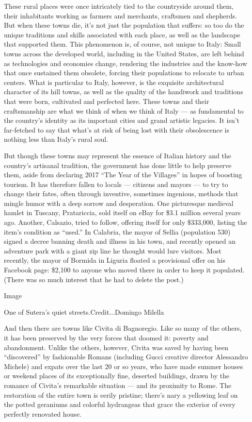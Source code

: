 These rural places were once intricately tied to the countryside around
them, their inhabitants working as farmers and merchants, craftsmen and
shepherds. But when these towns die, it's not just the population that
suffers: so too do the unique traditions and skills associated with each
place, as well as the landscape that supported them. This phenomenon is,
of course, not unique to Italy: Small towns across the developed world,
including in the United States, are left behind as technologies and
economies change, rendering the industries and the know-how that once
sustained them obsolete, forcing their populations to relocate to urban
centers. What is particular to Italy, however, is the exquisite
architectural character of its hill towns, as well as the quality of the
handiwork and traditions that were born, cultivated and perfected here.
These towns and their craftsmanship are what we think of when we think
of Italy --- as fundamental to the country's identity as its important
cities and grand artistic legacies. It isn't far-fetched to say that
what's at risk of being lost with their obsolescence is nothing less
than Italy's rural soul.

But though these towns may represent the essence of Italian history and
the country's artisanal tradition, the government has done little to
help preserve them, aside from declaring 2017 ``The Year of the
Villages'' in hopes of boosting tourism. It has therefore fallen to
locals --- citizens and mayors --- to try to change their fates, often
through inventive, sometimes ingenious, methods that mingle humor with a
deep sorrow and desperation. One picturesque medieval hamlet in Tuscany,
Pratariccia, sold itself on eBay for \$3.1 million several years ago.
Another, Calsazio, tried to follow, offering itself for only \$333,000,
listing the item's condition as ``used.'' In Calabria, the mayor of
Sellia (population 530) signed a decree banning death and illness in his
town, and recently opened an adventure park with a giant zip line he
thought would lure visitors. Most recently, the mayor of Bormida in
Liguria floated a provisional offer on his Facebook page: \$2,100 to
anyone who moved there in order to keep it populated. (There was so much
interest that he had to delete the post.)

Image

One of Sutera's quiet streets.Credit...Domingo Milella

And then there are towns like Civita di Bagnoregio. Like so many of the
others, it has been preserved by the very forces that doomed it: poverty
and abandonment. Unlike the others, however, Civita was saved by having
been ``discovered'' by fashionable Romans (including Gucci creative
director Alessandro Michele) and expats over the last 20 or so years,
who have made summer houses or weekend places of its exceptionally fine,
deserted buildings, drawn by the romance of Civita's remarkable
situation --- and its proximity to Rome. The restoration of the entire
town is eerily pristine; there's nary a yellowing leaf on the potted
geraniums and colorful hydrangeas that grace the exterior of every
perfectly renovated house.

